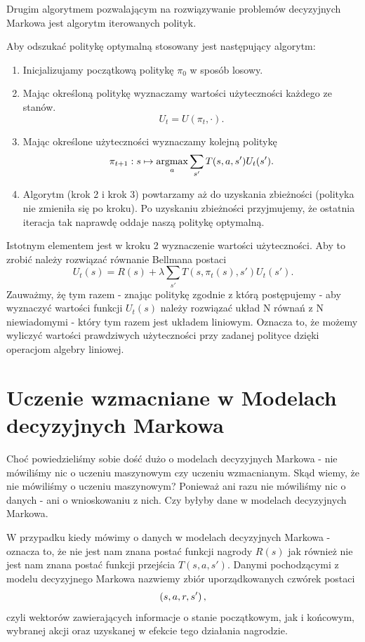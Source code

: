 \documentclass[10pt,a4paper]{book}
\newcommand{\argmax}{\operatornamewithlimits{argmax}}
\begin{document}
Drugim algorytmem pozwalającym na rozwiązywanie problemów decyzyjnych Markowa jest algorytm iterowanych polityk. 

\begin{definition}
Aby odszukać politykę optymalną stosowany jest następujący algorytm:
\begin{enumerate}
\item Inicjalizujamy początkową politykę $\pi_0$ w sposób losowy. 
\item Mając określoną politykę wyznaczamy wartości użyteczności każdego ze stanów.
$$
U_t = U(\pi_t, \cdot).
$$
\item Mając określone użyteczności wyznaczamy kolejną politykę
$$
\pi_{t+1}: s \mapsto \argmax_{a} \sum_{s'} T(s,a,s') U_t(s').
$$
\item Algorytm (krok 2 i krok 3) powtarzamy aż do uzyskania zbieżności (polityka nie zmieniła się po kroku). Po uzyskaniu zbieżności przyjmujemy, że ostatnia iteracja tak naprawdę oddaje naszą politykę optymalną.
\end{enumerate}

Istotnym elementem jest w kroku 2 wyznaczenie wartości użyteczności. Aby to zrobić należy rozwiązać równanie Bellmana postaci
$$
U_t(s) = R(s) + \lambda \sum_{s'} T(s, \pi_t(s), s') U_t(s').
$$
Zauważmy, żę tym razem - znając politykę zgodnie z którą postępujemy - aby wyznaczyć wartości funkcji $U_t(s)$ należy rozwiązać układ N równań z N niewiadomymi - który tym razem jest układem liniowym. Oznacza to, że możemy wyliczyć wartości prawdziwych użyteczności przy zadanej polityce dzięki operacjom algebry liniowej.
\end{definition}

\chapter{Uczenie wzmacniane w Modelach decyzyjnych Markowa}

Choć powiedzieliśmy sobie dość dużo o modelach decyzyjnych Markowa - nie mówiliśmy nic o uczeniu maszynowym czy uczeniu wzmacnianym. Skąd wiemy, że nie mówiliśmy o uczeniu maszynowym? Ponieważ ani razu nie mówiliśmy nic o danych - ani o wnioskowaniu z nich. Czy byłyby dane w modelach decyzyjnych Markowa.

\begin{definition}
W przypadku kiedy mówimy o danych w modelach decyzyjnych Markowa - oznacza to, że nie jest nam znana postać funkcji nagrody $R(s)$ jak również nie jest nam znana postać funkcji przejścia $T(s,a,s')$. Danymi pochodzącymi z modelu decyzyjnego Markowa nazwiemy zbiór uporządkowanych czwórek postaci 
$$
\left( {s,a,r,s'} \right),
$$
czyli wektorów zawierających informacje o stanie początkowym, jak i końcowym, wybranej akcji oraz uzyskanej w efekcie tego działania nagrodzie.
\end{definition}
\end{document}
